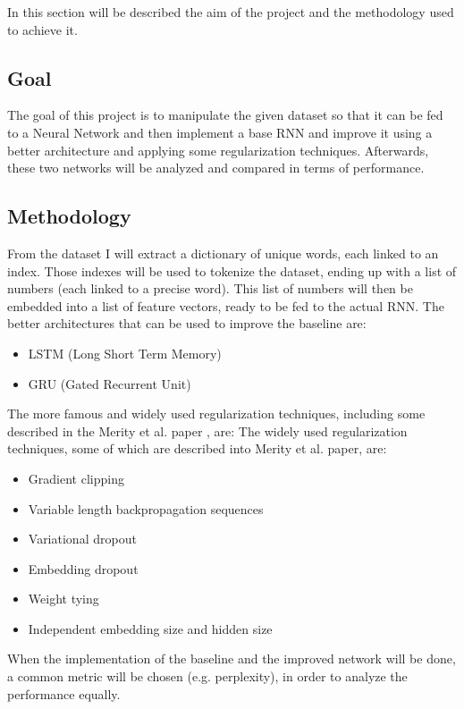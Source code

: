 In this section will be described the aim of the project and the methodology used to achieve it.

\subsection{Goal}
The goal of this project is to manipulate the given dataset so that it can be fed to a Neural Network and then implement a base RNN and improve it using a better architecture and applying some regularization techniques. Afterwards, these two networks will be analyzed and compared in terms of performance.

\subsection{Methodology}
From the dataset I will extract a dictionary of unique words, each linked to an index. Those indexes will be used to tokenize the dataset, ending up with a list of numbers (each linked to a precise word). This list of numbers will then be embedded into a list of feature vectors, ready to be fed to the actual RNN.
The better architectures that can be used to improve the baseline are:
\begin{itemize}
    \item LSTM (Long Short Term Memory)
    \item GRU (Gated Recurrent Unit)
\end{itemize}
The more famous and widely used regularization techniques, including some described in the Merity et al. paper \cite{merity2017regularizing}, are:
The widely used regularization techniques, some of which are described into Merity et al. \cite{merity2017regularizing} paper, are:
\begin{itemize}
    \item Gradient clipping
    \item Variable length backpropagation sequences
    \item Variational dropout
    \item Embedding dropout
    \item Weight tying
    \item Independent embedding size and hidden size
\end{itemize}
When the implementation of the baseline and the improved network will be done, a common metric will be chosen (e.g. perplexity), in order to analyze the performance equally.